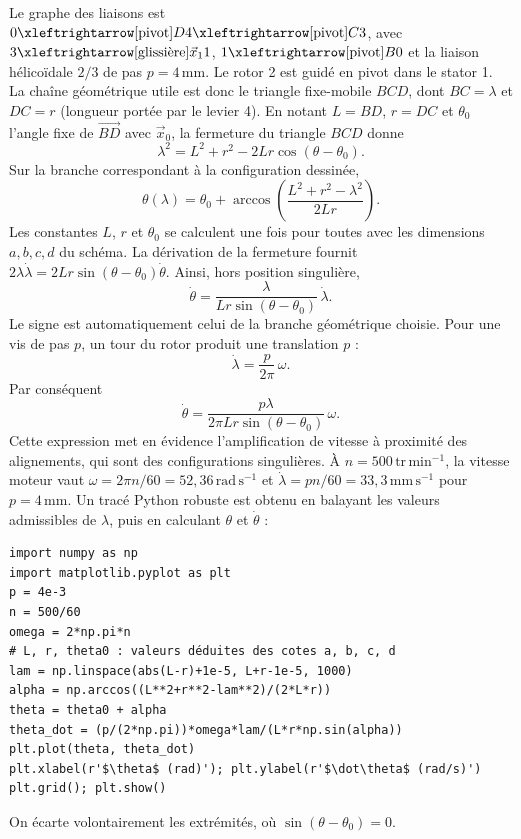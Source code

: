 \begin{corrigebox}
Le graphe des liaisons est
                $0\xleftrightarrow[\text{pivot}]{D}4\xleftrightarrow[\text{pivot}]{C}3$,
                avec $3\xleftrightarrow[\text{glissière}]{\vec x_1}1$,
                $1\xleftrightarrow[\text{pivot}]{B}0$ et la liaison hélicoïdale
                $2/3$ de pas $p=4\,\mathrm{mm}$. Le rotor 2 est guidé en pivot dans le
                stator 1. La chaîne géométrique utile est donc le triangle fixe-mobile
                $BCD$, dont $BC=\lambda$ et $DC=r$ (longueur portée par le levier 4).
En notant $L=BD$, $r=DC$ et $\theta_0$ l'angle fixe de
                $\overrightarrow{BD}$ avec $\vec x_0$, la fermeture du triangle $BCD$
                donne
                $$\lambda^2=L^2+r^2-2Lr\cos(\theta-\theta_0).$$
                Sur la branche correspondant à la configuration dessinée,
                $$\boxed{\theta(\lambda)=\theta_0+
                \arccos\!\left(\frac{L^2+r^2-\lambda^2}{2Lr}\right)}.$$
                Les constantes $L$, $r$ et $\theta_0$ se calculent une fois pour toutes
                avec les dimensions $a,b,c,d$ du schéma.
La dérivation de la fermeture fournit
                $2\lambda\dot\lambda=2Lr\sin(\theta-\theta_0)\dot\theta$.
                Ainsi, hors position singulière,
                $$\boxed{\dot\theta=
                \frac{\lambda}{Lr\sin(\theta-\theta_0)}\,\dot\lambda}.$$
                Le signe est automatiquement celui de la branche géométrique choisie.
Pour une vis de pas $p$, un tour du rotor produit une translation $p$ :
                $$\dot\lambda=\frac{p}{2\pi}\,\omega.$$
                Par conséquent
                $$\boxed{\dot\theta=
                \frac{p\lambda}{2\pi Lr\sin(\theta-\theta_0)}\,\omega}.$$
                Cette expression met en évidence l'amplification de vitesse à proximité
                des alignements, qui sont des configurations singulières.
À $n=500\,\mathrm{tr\,min^{-1}}$, la vitesse moteur vaut
                $\omega=2\pi n/60=52{,}36\,\mathrm{rad\,s^{-1}}$ et
                $\dot\lambda=pn/60=33{,}3\,\mathrm{mm\,s^{-1}}$ pour $p=4\,\mathrm{mm}$.
                Un tracé Python robuste est obtenu en balayant les valeurs admissibles de
                $\lambda$, puis en calculant $\theta$ et $\dot\theta$ :
                \begin{verbatim}
import numpy as np
import matplotlib.pyplot as plt
p = 4e-3
n = 500/60
omega = 2*np.pi*n
# L, r, theta0 : valeurs déduites des cotes a, b, c, d
lam = np.linspace(abs(L-r)+1e-5, L+r-1e-5, 1000)
alpha = np.arccos((L**2+r**2-lam**2)/(2*L*r))
theta = theta0 + alpha
theta_dot = (p/(2*np.pi))*omega*lam/(L*r*np.sin(alpha))
plt.plot(theta, theta_dot)
plt.xlabel(r'$\theta$ (rad)'); plt.ylabel(r'$\dot\theta$ (rad/s)')
plt.grid(); plt.show()
                \end{verbatim}
                On écarte volontairement les extrémités, où $\sin(\theta-\theta_0)=0$.
\end{corrigebox}
